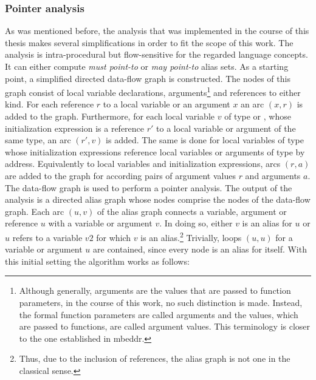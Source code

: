 \subsubsection*{Pointer analysis}
As was mentioned before, the analysis that was implemented in the course of this thesis makes several simplifications in order to fit the scope of this work. The analysis is intra-procedural but flow-sensitive for the regarded language concepts. It can either compute \textit{must point-to} or \textit{may point-to} alias sets.
As a starting point, a simplified directed data-flow graph is constructed. The nodes of this graph consist of local variable declarations, arguments\footnote{Although generally, arguments are the values that are passed to function parameters, in the course of this work, no such distinction is made. Instead, the formal function parameters are called arguments and the values, which are passed to functions, are called argument values. This terminology is closer to the one established in mbeddr.} and references to either kind. For each reference $r$ to a local variable or an argument $x$ an arc $(x, r)$ is added to the graph. Furthermore, for each local variable $v$ of type  or , whose initialization expression is a reference $r'$ to a local variable or argument of the same type, an arc $(r', v)$ is added. The same is done for local variables of type  whose initialization expressions reference local variables or arguments of type  by address. Equivalently to local variables and initialization expressions, arcs $(r, a)$ are added to the graph for according pairs of argument values $r$ and arguments $a$.
The data-flow graph is used to perform a pointer analysis. The output of the analysis is a directed alias graph whose nodes comprise the nodes of the data-flow graph. Each arc $(u, v)$ of the alias graph connects a variable, argument or reference $u$ with a variable or argument $v$. In doing so, either $v$ is an alias for $u$ or $u$ refers to a variable $v2$ for which $v$ is an alias.\footnote{Thus, due to the inclusion of references, the alias graph is not one in the classical sense.} Trivially, loops $(u, u)$ for a variable or argument $u$ are contained, since every node is an alias for itself. With this initial setting the algorithm works as follows:
